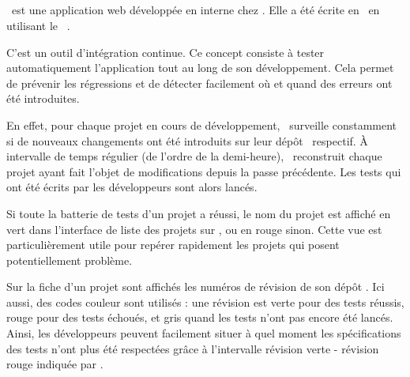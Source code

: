 \subsection{\asismo}
\label{section:sismo}

\asismo\ est une application web développée en interne chez \asl. Elle a été écrite en \aphp\ en utilisant le \afm\ \asf.

C'est un outil d'intégration continue. Ce concept consiste à tester automatiquement l'application tout au long de son développement. Cela permet de prévenir les régressions et de détecter facilement où et quand des erreurs ont été introduites.

En effet, pour chaque projet en cours de développement, \asismo\ surveille constamment si de nouveaux changements ont été introduits sur leur dépôt \asvn\ respectif. À intervalle de temps régulier (de l'ordre de la demi-heure), \asismo\ reconstruit chaque projet ayant fait l'objet de modifications depuis la passe précédente. Les tests qui ont été écrits par les développeurs sont alors lancés.

Si toute la batterie de tests d'un projet a réussi, le nom du projet est affiché en vert dans l'interface de liste des projets sur \asismo, ou en rouge sinon. Cette vue est particulièrement utile pour repérer rapidement les projets qui posent potentiellement problème.

Sur la fiche d'un projet sont affichés les numéros de révision de son dépôt \asvn. Ici aussi, des codes couleur sont utilisés : une révision est verte pour des tests réussis, rouge pour des tests échoués, et gris quand les tests n'ont pas encore été lancés. Ainsi, les développeurs peuvent facilement situer à quel moment les spécifications des tests n'ont plus été respectées grâce à l'intervalle révision verte - révision rouge indiquée par \asismo.
